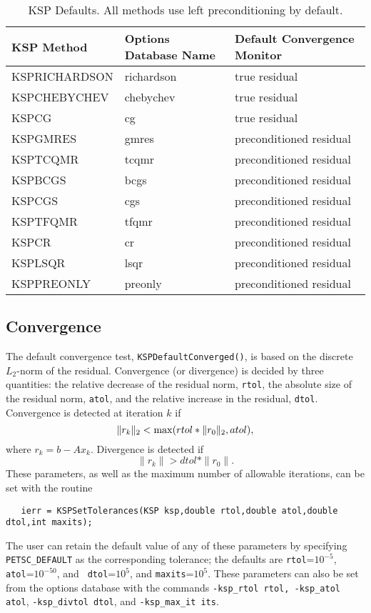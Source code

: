 \begin{table}
\caption{KSP Defaults.  All methods use left preconditioning by default.}
\begin{center}
\begin{tabular}{lll}
{\bf KSP Method}	& {\bf Options Database Name}	& {\bf Default Convergence Monitor}\\
\hline
KSPRICHARDSON	& richardson	& true residual	 \\
KSPCHEBYCHEV	& chebychev	& true residual	\\
KSPCG		& cg		& true residual	 \\
KSPGMRES	& gmres		& preconditioned residual \\
KSPTCQMR	& tcqmr		& preconditioned residual \\
KSPBCGS		& bcgs		& preconditioned residual \\
KSPCGS		& cgs		& preconditioned residual \\
KSPTFQMR	& tfqmr		& preconditioned residual \\
KSPCR		& cr		& preconditioned residual \\
KSPLSQR		& lsqr		& preconditioned residual \\
KSPPREONLY	& preonly	& preconditioned residual \\
\hline
\end{tabular}
\end{center}
\label{tab:kspdefaults}
\end{table}

\subsection{Convergence}

The default convergence test, {\tt KSPDefaultConverged()}, is 
based on the discrete $L_2$-norm of the residual. Convergence 
(or divergence) is decided by three quantities:
the relative decrease of the residual norm, {\tt rtol}, the absolute 
size of the residual norm, {\tt atol}, and the relative increase in the 
residual, {\tt dtol}.  Convergence is detected at iteration $k$ if
\[  \| r_k \|_2 < {\rm max} ( rtol * \| r_0 \|_2, atol ), \]
where $r_k = b - A x_k$.  Divergence is detected if
\[  \| r_k \| > dtol * \| r_0 \|. \]
These parameters, as well as the maximum number of allowable iterations, 
can be set with the routine 
\begin{verbatim}
   ierr = KSPSetTolerances(KSP ksp,double rtol,double atol,double dtol,int maxits);
\end{verbatim}
The user can retain the default value of any of these parameters by
specifying {\tt PETSC\_DEFAULT}  as the 
corresponding tolerance; the
defaults are {\tt rtol}=$10^{-5}$, {\tt atol}=$10^{-50}$, and {\tt
dtol}=$10^{5}$, and {\tt maxits}=$10^5$.
These parameters can also be set from the options database with the 
commands {\tt -ksp\_rtol rtol, -ksp\_atol atol}, {\tt -ksp\_divtol dtol},
  
and {\tt -ksp\_max\_it its}. 

